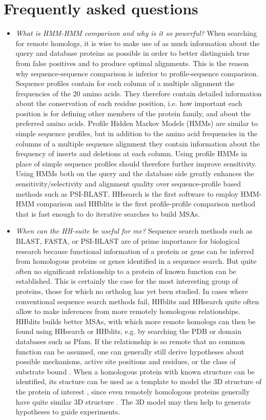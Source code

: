 \documentclass[11pt,a4paper]{article}
\begin{document}
\section{Frequently asked questions}

\begin{itemize}

\item \emph{What is HMM-HMM comparison and why is it so powerful?}
When searching for remote homologs, it is wise to make use of as much information about the query and database proteins as possible in order to better distinguish true from false positives and to produce optimal alignments. This is the reason why sequence-sequence comparison is inferior to profile-sequence comparison. Sequence profiles contain for each column of a multiple alignment the frequencies of the 20 amino acids. They therefore contain detailed information about the conservation of each residue position, i.e. how important each position is for defining other members of the protein family, and about the preferred amino acids. Profile Hidden Markov Models (HMMs) are similar to simple sequence profiles, but in addition to the amino acid frequencies in the columns of a multiple sequence alignment they contain information about the frequency of inserts and deletions at each column. Using profile HMMs in place of simple sequence profiles should therefore further improve sensitivity. Using HMMs both on the query and the database side greatly enhances the sensitivity/selectivity and alignment quality over sequence-profile based methods such as PSI-BLAST. HHsearch is the first software to employ HMM-HMM comparison and HHblits is the first profile-profile comparison method that is fast enough to do iterative searches to build MSAs. 

\item \emph{When can the HH-suite be useful for me?}
Sequence search methods such as BLAST, FASTA, or PSI-BLAST are of prime importance for biological research because functional information of a protein or gene can be inferred from homologous proteins or genes identified in a sequence search. But quite often no significant relationship to a protein of known function can be established. This is certainly the case for the most interesting group of proteins, those for which no ortholog has yet been studied. In cases where conventional sequence search methods fail, HHblits and HHsearch quite often allow to make inferences from more remotely homologous relationships. HHblits builds better MSAs, with which more remote homologs can then be found using HHsearch or HHblits, e.g. by searching the PDB or domain databases such as Pfam. If the relationship is so remote that no common function can be assumed, one can generally still derive hypotheses about possible mechanisms, active site positions and residues, or the class of substrate bound \cite{Todd:2001, Pawlowski:2000}. When a homologous protein with known structure can be identified, its stucture can be used as a template to model the 3D structure of the protein of interest \cite{Rychlewski:1998}, since even remotely homologous proteins generally have quite similar 3D structure \cite{Kinch:2002}. The 3D model may then help to generate hypotheses to guide experiments. 


\end{itemize}
\end{document}
